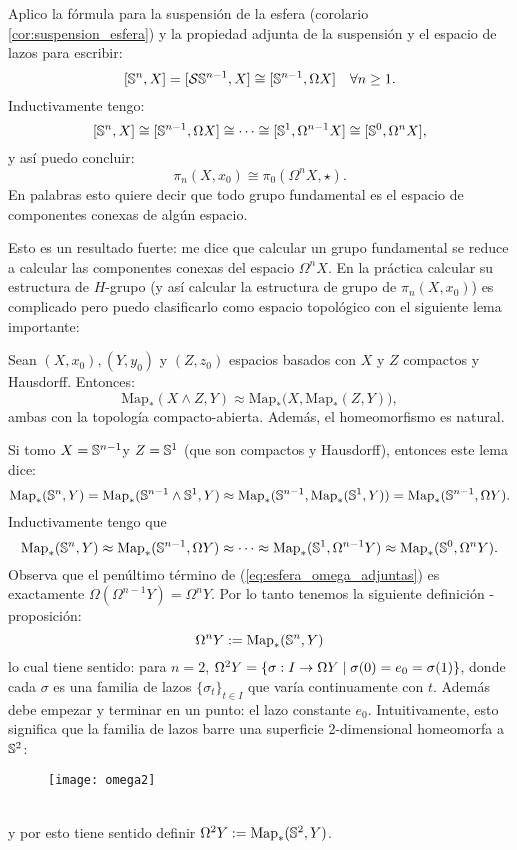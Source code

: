 \documentclass[../../topologia_algebraica]{subfiles}
\begin{document}
Aplico la f\'ormula para la suspensi\'on de la esfera (corolario \ref{cor:suspension_esfera}) y
la propiedad adjunta de la suspensi\'on y el espacio de lazos para escribir:
\[
  [\mathbb{S}^n,X]=[\mathcal{S}\mathbb{S}^{n-1},X] \cong [\mathbb{S}^{n-1},\Omega X] \quad\forall n\geq 1.
\]
Inductivamente tengo:
\[
  [\mathbb{S}^n,X]\cong[\mathbb{S}^{n-1},\Omega X]\cong\cdots\cong [\mathbb{S}^1,\Omega^{n-1}X]\cong[\mathbb{S}^0,\Omega^n X],
\]
y as\'i puedo concluir:
\[
  \pi_n(X,x_0)\cong\pi_0(\Omega^n X,\star).
\]
En palabras esto quiere decir que todo grupo fundamental es el espacio de componentes conexas de
alg\'un espacio.

Esto es un resultado fuerte: me dice que calcular un grupo fundamental se reduce a calcular las
componentes conexas del espacio $\Omega^nX$. En la pr\'actica calcular su estructura de $H$-grupo
(y as\'i calcular la estructura de grupo de $\pi_n(X,x_0)$) es complicado pero puedo clasificarlo
como espacio topol\'ogico con el siguiente lema importante:

\begin{lema}
  Sean $(X,x_0),(Y,y_0)$ y $(Z,z_0)$ espacios basados con $X$ y $Z$ compactos y Hausdorff.
  Entonces:
  \[
    \text{Map}_*(X\wedge Z,Y)\approx\text{Map}_*\big(X, \text{Map}_*(Z,Y) \big),
  \]
  ambas con la topolog\'ia compacto-abierta. Adem\'as, el homeomorfismo es natural.
\end{lema}

Si tomo $X=\mathbb{S}^{n-1}$y $Z=\mathbb{S}^1$ (que son compactos y Hausdorff), entonces este lema dice:
\[
  \text{Map}_*(\mathbb{S}^n,Y)=\text{Map}_*(\mathbb{S}^{n-1}\wedge\mathbb{S}^1,Y)\approx
  \text{Map}_*(\mathbb{S}^{n-1},\text{Map}_*(\mathbb{S}^1,Y))=\text{Map}_*(\mathbb{S}^{n-1},\Omega Y).
\]
Inductivamente tengo que
\begin{equation}\label{eq:esfera_omega_adjuntas}
  \text{Map}_*(\mathbb{S}^n,Y) \approx \text{Map}_*(\mathbb{S}^{n-1},\Omega Y) \approx \cdots\approx
  \text{Map}_*(\mathbb{S}^1,\Omega^{n-1}Y) \approx \text{Map}_*(\mathbb{S}^0,\Omega^{n}Y).
\end{equation}
Observa que el pen\'ultimo t\'ermino de (\ref{eq:esfera_omega_adjuntas}) es exactamente
$\Omega(\Omega^{n-1} Y)=\Omega^n Y$. Por lo tanto tenemos la siguiente definici\'on - proposici\'on:
\begin{equation}\label{def:omega_n}
  \Omega^nY:=\text{Map}_*(\mathbb{S}^n,Y)
\end{equation}
lo cual tiene sentido: para $n=2$, $\Omega^2Y=\{\sigma:I\rightarrow\Omega Y\mid \sigma(0)=e_0=\sigma(1)\}$,
donde cada $\sigma$ es una familia de lazos $\{\sigma_t\}_{t\in I}$ que var\'ia continuamente con
$t$. Adem\'as debe empezar y terminar en un punto: el lazo constante $e_0$. Intuitivamente, esto
significa que la familia de lazos barre una superficie 2-dimensional homeomorfa a $\mathbb{S}^2$:\\ %
\begin{figure}[ht]
  \centering
  \texttt{[image: omega2]}
\end{figure}\\ %
y por esto tiene sentido definir $\Omega^2Y:=\text{Map}_*(\mathbb{S}^2,Y)$.
\end{document}
